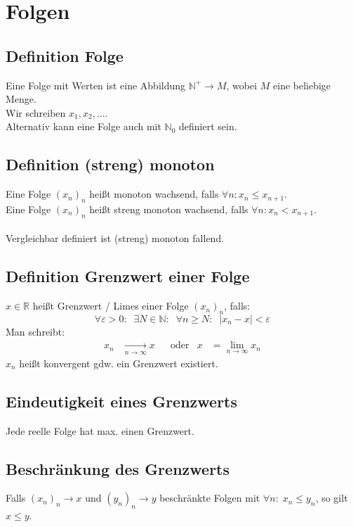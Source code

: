 \documentclass[halfparscip]{scrartcl}
\newcounter{subsection2}
\begin{document}
\newpage
\section{Folgen}

\subsection{Definition Folge}
Eine Folge mit Werten ist eine Abbildung $\mathbb{N}^+ \rightarrow M$, wobei $M$ eine beliebige Menge.\\
Wir schreiben $x_1, x_2, ...$.\\
Alternativ kann eine Folge auch mit $\mathbb{N}_0$ definiert sein.

\subsection{Definition (streng) monoton}
Eine Folge $(x_n)_n$ heißt monoton wachsend, falls $\forall n: x_n \leq x_{n+1}$.\\
Eine Folge $(x_n)_n$ heißt streng monoton wachsend, falls $\forall n: x_n < x_{n+1}$.\\\\
Vergleichbar definiert ist (streng) monoton fallend.

\subsection{Definition Grenzwert einer Folge}
$x \in \mathbb{R}$ heißt Grenzwert / Limes einer Folge $(x_n)_n$, falls:
\begin{equation*}
	\forall \varepsilon > 0:\;\; \exists N \in \mathbb{N}:\;\; \forall n \geq N:\;\; \vert x_n - x\vert < \varepsilon
\end{equation*}
Man schreibt:
\begin{align*}
	x_n &\xrightarrow[n \rightarrow \infty]{} x &&\text{oder} & x &= \lim_{n \rightarrow \infty} x_n
\end{align*}
$x_n$ heißt konvergent gdw. ein Grenzwert existiert.

\subsection{Eindeutigkeit eines Grenzwerts}
Jede reelle Folge hat max. einen Grenzwert.

\subsection{Beschränkung des Grenzwerts}
Falls $(x_n)_n \rightarrow x$ und $(y_n)_n \rightarrow y$ beschränkte Folgen mit $\forall n: \; x_n \leq y_n$, so gilt $x \leq y$.
\end{document}
